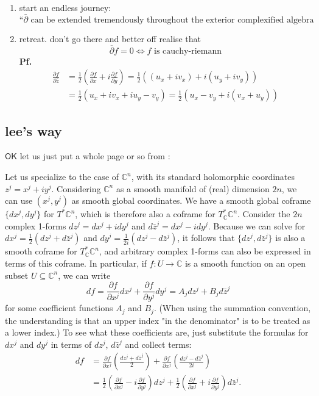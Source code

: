 \begin{enumerate}
\item start an endless journey:
	\[\text{``\(\bar\partial\) can be extended tremendously throughout the exterior complexified algebra to yield a cohomology theory"} \]
\item retreat. don't go there and better off realise that
\[\boxed{\overline{\partial}f=0 \iff f\text{ is cauchy-riemann}}\]
\textbf{Pf.}
\begin{align*}
\frac{\partial f}{\partial \bar{z}}
&= \frac{1}{2} \left( \frac{\partial f}{\partial x} + i \frac{\partial f}{\partial y} \right)= \frac{1}{2} \left( \left( u_x + i v_x \right) + i \left( u_y + i v_y \right) \right)\\
&= \frac{1}{2} \left( u_x + i v_x + i u_y - v_y \right)= \frac{1}{2} \left( u_x - v_y + i (v_x + u_y) \right)
\end{align*}
	
\end{enumerate}
\subsection*{lee's way}
\(\mathsf{OK}\) let us just put a whole page or so from \cite{lec}:

Let us specialize to the case of $\mathbb{C}^n$, with its standard holomorphic coordinates $z^j = x^j + i y^j$. Considering $\mathbb{C}^n$ as a smooth manifold of (real) dimension $2n$, we can use $(x^j,y^j)$ as smooth global coordinates. We have a smooth global coframe $\{dx^j, dy^j\}$ for $T^*\mathbb{C}^n$, which is therefore also a coframe for $T^*_\mathbb{C}\mathbb{C}^n$. Consider the $2n$ complex 1-forms $dz^j = dx^j + i dy^j$ and $d\bar{z}^j = dx^j - i dy^j$. Because we can solve for $dx^j = \frac{1}{2}(dz^j+d\bar{z}^j)$ and $dy^j = \frac{1}{2i}(dz^j - d\bar{z}^j)$, it follows that $\{dz^j, d\bar{z}^j\}$ is also a smooth coframe for $T^*_\mathbb{C}\mathbb{C}^n$, and arbitrary complex 1-forms can also be expressed in terms of this coframe. In particular, if $f : U \to \mathbb{C}$ is a smooth function on an open subset $U \subseteq \mathbb{C}^n$, we can write
\[
  df = \frac{\partial f}{\partial x^j} dx^j + \frac{\partial f}{\partial y^j} dy^j = A_j dz^j + B_j d\bar{z}^j
\]
for some coefficient functions $A_j$ and $B_j$. (When using the summation convention, the understanding is that an upper index "in the denominator" is to be treated as a lower index.) To see what these coefficients are, just substitute the formulas for $dx^j$ and $dy^j$ in terms of $dz^j$, $d\bar{z}^j$ and collect terms:
\begin{equation}\label{eq:local}\begin{aligned}
  df &= \frac{\partial f}{\partial x^j}\left(\frac{dz^j + d\bar{z}^j}{2}\right) + \frac{\partial f}{\partial x^j}\left(\frac{dz^j - d\bar{z}^j}{2i}\right) \nonumber\\[8pt]
  &= \frac{1}{2}\left(\frac{\partial f}{\partial x^j} - i\frac{\partial f}{\partial y^j}\right)dz^j + \frac{1}{2}\left(\frac{\partial f}{\partial x^j} + i\frac{\partial f}{\partial y^j}\right)d\bar{z}^j.
\end{aligned}\end{equation}

